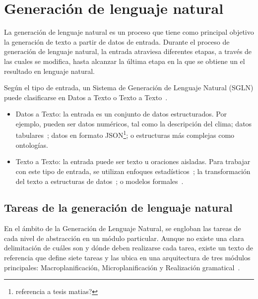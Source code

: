 \section{Generación de lenguaje natural}
\label{sec:tareas_gnl}
La generación de lenguaje natural es un proceso que tiene como principal objetivo la generación de texto a partir de datos de entrada.
Durante el proceso de generación de lenguaje natural, la entrada atraviesa diferentes etapas, a través de las cuales se modifica, hasta alcanzar la última etapa en la que se obtiene un el resultado en lenguaje natural.

Según el tipo de entrada, un Sistema de Generación de Lenguaje Natural (SGLN) puede clasificarse en Datos a Texto o Texto a Texto~\cite{vicente2015generacion}.
\begin{itemize}
    \item Datos a Texto: la entrada es un conjunto de datos estructurados. Por ejemplo, pueden ser datos numéricos, tal como la descripción del clima; datos  tabulares~\cite{mahapatra2016statistical}; datos en formato JSON\footnote{referencia a tesis matias?}; o estructuras más complejas como ontologías.
    \item Texto a Texto: la entrada puede ser texto u oraciones aisladas. Para trabajar con este tipo de entrada, se utilizan enfoques estadísticos~\cite{mittal1999ultra}; la transformación del texto a estructuras de datos~\cite{saldanha2004creation}; o modelos formales~\cite{guo2018long}.
\end{itemize}

\subsection{Tareas de la generación de lenguaje natural}
En el ámbito de la Generación de Lenguaje Natural, se engloban las tareas de cada nivel de abstracción en un módulo particular. Aunque no existe una clara delimitación de cuáles son y dónde deben realizarse cada tarea, existe un texto de referencia que define siete tareas y las ubica en una arquitectura de tres módulos principales: Macroplanificación, Microplanificación y Realización gramatical~\cite{vicente2015generacion}.

